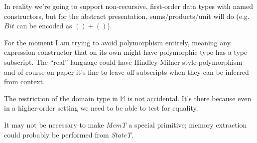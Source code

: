 \documentclass{article}[11pt]
\begin{document}
In reality we're going to support non-recursive, first-order data types with named constructors, but for the abstract presentation, sums/products/unit will do (e.g. $Bit$ can be encoded as $() + ()$).

For the moment I am trying to avoid polymorphism entirely, meaning any expression constructor that on its own might have polymorphic type has a type subscript. The ``real'' language could have Hindley-Milner style polymorphism and of course on paper it's fine to leave off subscripts when they can be inferred from context.

The restriction of the domain type in $\mathbb{M}$ is not accidental. It's there because even in a higher-order setting we need to be able to test for equality.

It may not be necessary to make {\it MemT} a special primitive; memory extraction could probably be performed from {\it StateT}.
\end{document}
